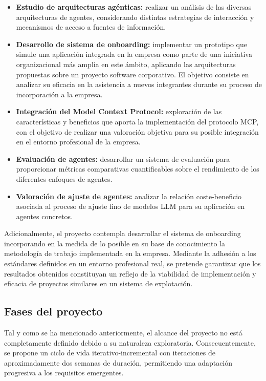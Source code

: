 \begin{itemize}
  \item\textbf{Estudio de arquitecturas agénticas: }realizar un análisis de las diversas arquitecturas de agentes, considerando distintas estrategias de interacción y mecanismos de acceso a fuentes de información.
\item\textbf{Desarrollo de sistema de onboarding: }implementar un prototipo que simule una aplicación integrada en la empresa como parte de una iniciativa organizacional más amplia en este ámbito, aplicando las arquitecturas propuestas sobre un proyecto software corporativo. El objetivo consiste en analizar su eficacia en la asistencia a nuevos integrantes durante su proceso de incorporación a la empresa.
  \item\textbf{Integración del Model Context Protocol: }exploración de las características y beneficios que aporta la implementación del protocolo MCP, con el objetivo de realizar una valoración objetiva para su posible integración en el entorno profesional de la empresa.
  \item\textbf{Evaluación de agentes: }desarrollar un sistema de evaluación para proporcionar métricas comparativas cuantificables sobre el rendimiento de los diferentes enfoques de agentes. 
  \item\textbf{Valoración de ajuste de agentes: }analizar la relación coste-beneficio asociada al proceso de ajuste fino de modelos LLM para su aplicación en agentes concretos.
\end{itemize}

Adicionalmente, el proyecto contempla desarrollar el sistema de onboarding incorporando en la medida de lo posible en su base de conocimiento la metodología de trabajo implementada en la empresa. Mediante la adhesión a los estándares definidos en un entorno profesional real, se pretende garantizar que los resultados obtenidos constituyan un reflejo de la viabilidad de implementación y eficacia de proyectos similares en un sistema de explotación. 

\subsection{Fases del proyecto}
Tal y como se ha mencionado anteriormente, el alcance del proyecto no está completamente definido debido a su naturaleza exploratoria. Consecuentemente, se propone un ciclo de vida iterativo-incremental con iteraciones de aproximadamente dos semanas de duración, permitiendo una adaptación progresiva a los requisitos emergentes.

